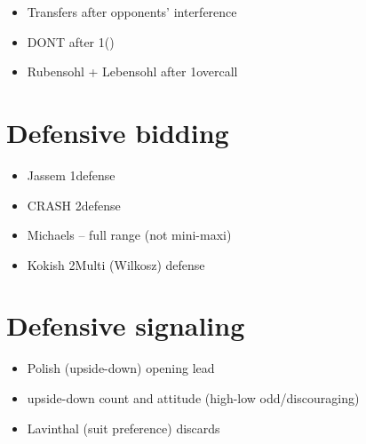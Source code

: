 \documentclass[12pt, a4paper]{report}
\begin{document}
{        \begin{itemize}
            \item Transfers after opponents' interference
            \item DONT after 1\nt (\dbl)
            \item Rubensohl + Lebensohl after 1\nt overcall
        \end{itemize}

    \section*{\colorbox{blue!30}{Defensive bidding}}

        \begin{itemize}
            \item Jassem 1\nt defense
            \item CRASH 2\nt defense
            \item Michaels -- full range (not mini-maxi)
            \item Kokish 2\diams Multi (Wilkosz) defense
        \end{itemize}

    \section*{\colorbox{blue!30}{Defensive signaling}}

        \begin{itemize}
            \item Polish (upside-down) opening lead
            \item upside-down count and attitude (high-low odd/discouraging)
            \item Lavinthal (suit preference) discards
        \end{itemize}

}
\end{document}

